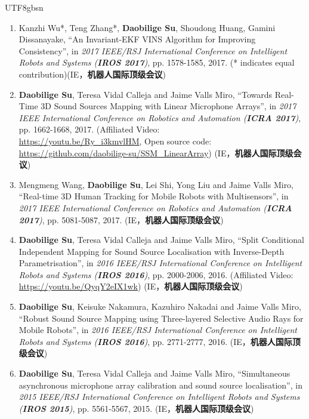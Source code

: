 \documentclass[margin,line]{res}
\begin{document}
\begin{CJK*}{UTF8}{gbsn}
\begin{resume}
\begin{enumerate}
\item Kanzhi Wu*, Teng Zhang*, {\bf Daobilige Su}, Shoudong Huang, Gamini Dissanayake, ``An Invariant-EKF VINS Algorithm for Improving Consistency'', in {\it 2017 IEEE/RSJ International Conference on Intelligent Robots and Systems (\textbf{IROS 2017})}, pp. 1578-1585, 2017.
(* indicates equal contribution)(IE，\textbf{机器人国际顶级会议})

\item {\bf Daobilige Su}, Teresa Vidal Calleja and Jaime Valls Miro, ``Towards Real-Time 3D Sound Sources Mapping with Linear Microphone Arrays'', in {\it 2017 IEEE International Conference on Robotics and Automation (\textbf{ICRA 2017})}, pp. 1662-1668, 2017.
(Affiliated Video: \\ \href{https://youtu.be/Ry_i3kmvlHM}{{https://youtu.be/Ry\_i3kmvlHM}}, Open source code: \\ \href{https://github.com/daobilige-su/SSM_LinearArray}{{https://github.com/daobilige-su/SSM\_LinearArray}}) (IE，\textbf{机器人国际顶级会议})

\item Mengmeng Wang, {\bf Daobilige Su}, Lei Shi, Yong Liu and Jaime Valls Miro, ``Real-time 3D Human Tracking for Mobile Robots with Multisensors'', in {\it 2017 IEEE International Conference on Robotics and Automation (\textbf{ICRA 2017})}, pp. 5081-5087, 2017. (IE，\textbf{机器人国际顶级会议})

\item {\bf Daobilige Su}, Teresa Vidal Calleja and Jaime Valls Miro, ``Split Conditional Independent Mapping for Sound Source Localisation with Inverse-Depth Parametrisation'', in {\it 2016 IEEE/RSJ International Conference on Intelligent Robots and Systems (\textbf{IROS 2016})}, pp. 2000-2006, 2016. (Affiliated Video: \href{https://youtu.be/QyqY2eIX1wk}{{https://youtu.be/QyqY2eIX1wk}}) (IE，\textbf{机器人国际顶级会议})

\item {\bf Daobilige Su}, Keisuke Nakamura, Kazuhiro Nakadai and Jaime Valls Miro, ``Robust Sound Source Mapping using Three-layered Selective Audio Rays for Mobile Robots'', in {\it 2016 IEEE/RSJ International Conference on Intelligent Robots and Systems (\textbf{IROS 2016})}, pp. 2771-2777, 2016. (IE，\textbf{机器人国际顶级会议})

\item {\bf Daobilige Su}, Teresa Vidal Calleja and Jaime Valls Miro, ``Simultaneous asynchronous microphone array calibration and sound source localisation'', in {\it 2015 IEEE/RSJ International Conference on Intelligent Robots and Systems (\textbf{IROS 2015})}, pp. 5561-5567, 2015. (IE，\textbf{机器人国际顶级会议})


\end{enumerate}
\end{resume}
\end{CJK*}
\end{document}
